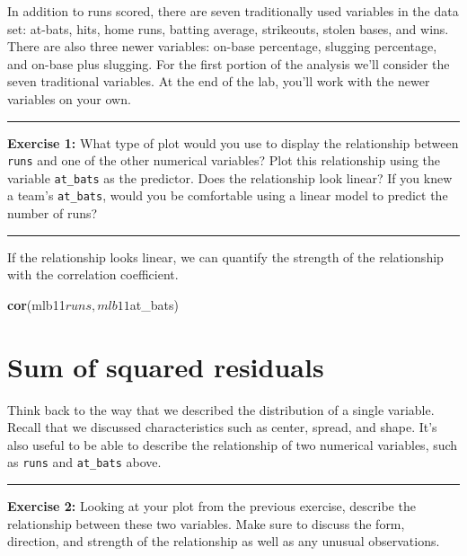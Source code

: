 \documentclass[]{book}
\newenvironment{Shaded}{\begin{snugshade}}{\end{snugshade}}
\newcommand{\KeywordTok}[1]{\textcolor[rgb]{0.13,0.29,0.53}{\textbf{{#1}}}}
\newcommand{\NormalTok}[1]{{#1}}
\theoremstyle{definition}
\theoremstyle{definition}
\theoremstyle{definition}
\theoremstyle{remark}
\begin{document}
In addition to runs scored, there are seven traditionally used variables
in the data set: at-bats, hits, home runs, batting average, strikeouts,
stolen bases, and wins. There are also three newer variables: on-base
percentage, slugging percentage, and on-base plus slugging. For the
first portion of the analysis we'll consider the seven traditional
variables. At the end of the lab, you'll work with the newer variables
on your own.

\begin{center}\rule{0.5\linewidth}{\linethickness}\end{center}

\textbf{Exercise 1:} What type of plot would you use to display the
relationship between \texttt{runs} and one of the other numerical
variables? Plot this relationship using the variable \texttt{at\_bats}
as the predictor. Does the relationship look linear? If you knew a
team's \texttt{at\_bats}, would you be comfortable using a linear model
to predict the number of runs?

\begin{center}\rule{0.5\linewidth}{\linethickness}\end{center}

If the relationship looks linear, we can quantify the strength of the
relationship with the correlation coefficient.

\begin{Shaded}
\begin{Highlighting}[]
\KeywordTok{cor}\NormalTok{(mlb11$runs, mlb11$at_bats)}
\end{Highlighting}
\end{Shaded}

\section{Sum of squared residuals}\label{sum-of-squared-residuals}

Think back to the way that we described the distribution of a single
variable. Recall that we discussed characteristics such as center,
spread, and shape. It's also useful to be able to describe the
relationship of two numerical variables, such as \texttt{runs} and
\texttt{at\_bats} above.

\begin{center}\rule{0.5\linewidth}{\linethickness}\end{center}

\textbf{Exercise 2:} Looking at your plot from the previous exercise,
describe the relationship between these two variables. Make sure to
discuss the form, direction, and strength of the relationship as well as
any unusual observations.
\end{document}
